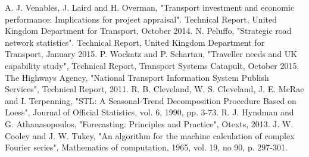 \documentclass[conference]{IEEEtran}
\begin{document}
\begin{thebibliography}{00}
 A. J. Venables, J. Laird and H. Overman, "Transport investment and economic performance: Implications for project appraisal". Technical Report, United Kingdom Department for Transport, October 2014.
 N. Peluffo, "Strategic road network statistics". Technical Report, United Kingdom Department for Transport, January 2015.
 P. Wockatz and P. Schartau, "Traveller needs and UK capability study", Technical Report, Transport Systems Catapult, October 2015.
 The Highways Agency, "National Transport Information System Publish Services", Technical Report, 2011. 
 R. B. Cleveland, W. S. Cleveland, J. E. McRae and I. Terpenning, "STL: A Seasonal-Trend Decomposition Procedure Based on Loess", Journal of Official Statistics, vol. 6, 1990, pp. 3-73.
 R. J. Hyndman and G. Athanasopoulos, "Forecasting: Principles and Practice", Otexts, 2013.
 J. W. Cooley and J. W. Tukey, "An algorithm for the machine calculation of complex Fourier series", Mathematics of computation, 1965, vol. 19, no 90, p. 297-301.

\end{thebibliography}
\end{document}
